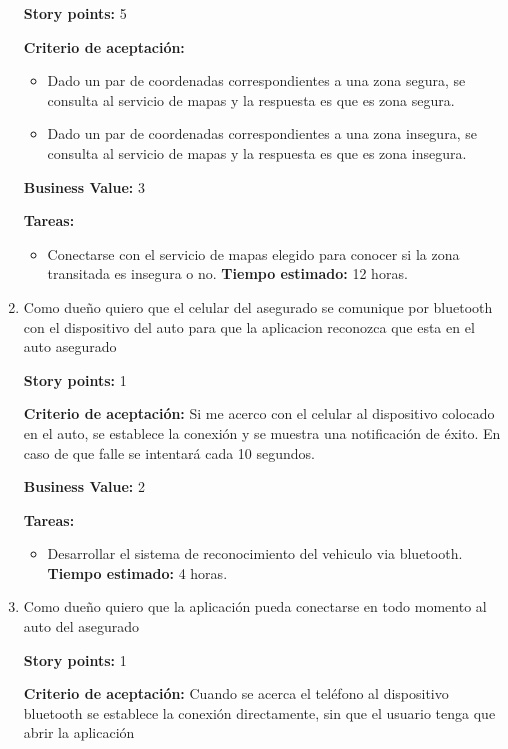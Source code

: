 \begin{enumerate}
\textbf{Story points:} 5

\textbf{Criterio de aceptación:}
	\begin{itemize}
		\item Dado un par de coordenadas correspondientes a una zona segura, se consulta al servicio de mapas y la respuesta es que es zona segura.
		\item Dado un par de coordenadas correspondientes a una zona insegura, se consulta al servicio de mapas y la respuesta es que es zona insegura.
	\end{itemize}

\textbf{Business Value:} 3

\textbf{Tareas:}
	\begin{itemize}
		\item Conectarse con el servicio de mapas elegido para conocer si la zona transitada es insegura o no.
		\newline \textbf{Tiempo estimado:} 12 horas.
	\end{itemize}





\item Como dueño quiero que el celular del asegurado se comunique por bluetooth con el dispositivo del auto para que la aplicacion reconozca que esta en el auto asegurado

\textbf{Story points:} 1

\textbf{Criterio de aceptación:}
Si me acerco con el celular al dispositivo colocado en el auto, se establece la conexión y se muestra una notificación de éxito. En caso de que falle se intentará cada 10 segundos.

\textbf{Business Value:} 2

\textbf{Tareas:}
	\begin{itemize}
		\item Desarrollar el sistema de reconocimiento del vehiculo via bluetooth.
		\newline \textbf{Tiempo estimado:} 4 horas.
	\end{itemize}






\item Como dueño quiero que la aplicación pueda conectarse en todo momento al auto del asegurado

\textbf{Story points:} 1

\textbf{Criterio de aceptación:}
Cuando se acerca el teléfono al dispositivo bluetooth se establece la conexión directamente, sin que el usuario tenga que abrir la aplicación


\end{enumerate}
